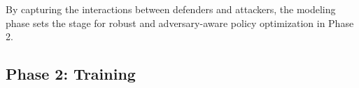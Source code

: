 \documentclass[conference]{IEEEtran}
\begin{document}
By capturing the interactions between defenders and attackers, the modeling phase sets the stage for robust and adversary-aware policy optimization in Phase 2.


\subsection{Phase 2: Training}
\end{document}
